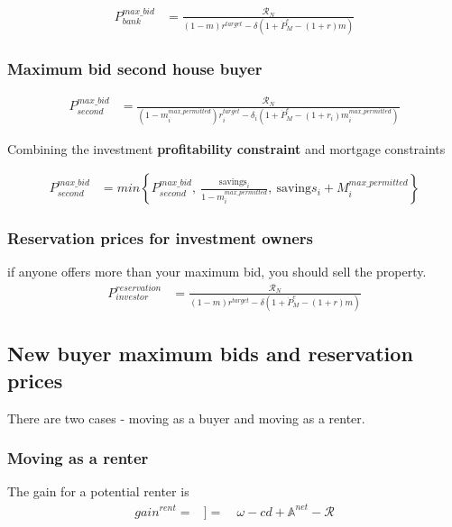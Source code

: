 {\begin{eqnarray}\label{eqn-max-investment-bid}
P_{bank}^{max\_bid} & = \frac{\mathcal{R}_N}{(1-m)r^{target}-\delta \left(1 + \dot P_M^e - (1+r)m\right)} 
\end{eqnarray}


\subsubsection{Maximum bid second house buyer}

\begin{eqnarray}\label{eqn-max-second-bid}
P_{second}^{max\_bid} & = \frac{\mathcal{R}_N}{(1-m_i^{max\_permitted})r_i^{target}-\delta_i \left(1 + \dot P_M^e - (1+r_i)m_i^{max\_permitted}\right)}  \nonumber
\end{eqnarray}

Combining the investment \textbf{profitability constraint} and mortgage constraints

\begin{eqnarray}
P_{second}^{max\_bid} & = min \left\{P_{second}^{max\_bid},\ \frac{\mathrm{savings}_i}{1-m_i^{max\_permitted}},\ \mathrm{saving}s_i + M_i^{max\_permitted}  \right\}  \nonumber
\end{eqnarray}

\subsubsection{Reservation prices for investment owners}
 if anyone offers more than your maximum bid, you should sell the property. 
\begin{eqnarray}
P_{investor}^{reservation} & =    \frac{\mathcal{R}_N}{(1-m)r^{target}-\delta \left(1 + \dot P_M^e - (1+r)m\right)}  \nonumber\end{eqnarray}


\subsection{New buyer maximum bids and reservation prices }

There are two cases - moving as a buyer and moving as a renter.

\subsubsection{Moving as a renter}
The gain for a potential renter is 
\begin{align}
gain^{rent}=&]
=&\ \omega-cd+\mathbb{A}^{net}-\mathcal{R}
  \nonumber
\end{align}

}
